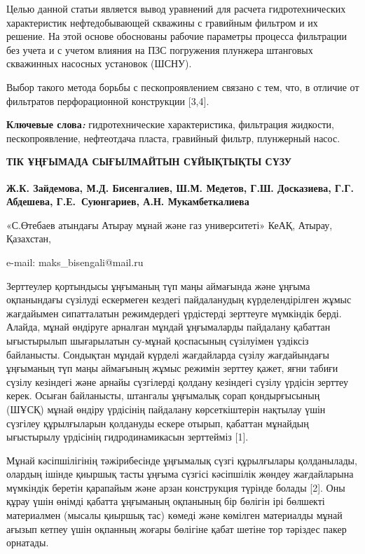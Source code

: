 Целью данной статьи является вывод уравнений для расчета
гидротехнических характеристик нефтедобывающей скважины с гравийным
фильтром и их решение. На этой основе обоснованы рабочие параметры
процесса фильтрации без учета и с учетом влияния на ПЗС погружения
плунжера штанговых скважинных насосных установок (ШСНУ).

Выбор такого метода борьбы с пескопроявлением связано с тем, что, в
отличие от фильтратов перфорационной конструкции {[}3,4{]}.

{\bfseries Ключевые слова\emph{:}} гидротехнические характеристика,
фильтрация жидкости, пескопроявление, нефтеотдача пласта, гравийный
фильтр, плунжерный насос.

\begin{articleheader}
{\bfseries ТІК ҰҢҒЫМАДА СЫҒЫЛМАЙТЫН СҰЙЫҚТЫҚТЫ СҮЗУ}

{\bfseries
Ж.К. Зайдемова,
М.Д. Бисенгалиев\textsuperscript{\envelope },
Ш.М. Медетов,
Г.Ш. Досказиева,
Г.Г. Абдешева,
Г.Е.~Суюнгариев,
А.Н. Мукамбеткалиева
}
\end{articleheader}

\begin{affiliation}
«С.Өтебаев атындағы Атырау мұнай және газ университеті» КеАҚ, Атырау, Қазахстан,

e-mail: maks\_bisengali@mail.ru
\end{affiliation}

Зерттеулер қортындысы ұңғыманың түп маңы аймағында және ұңғыма
оқпанындағы сүзілуді ескермеген кездегі пайдаланудың күрделендірілген
жұмыс жағдайымен сипатталатын режимдердегі үрдістерді зерттеуге
мүмкіндік берді. Алайда, мұнай өндіруге арналған мұндай ұңғымаларды
пайдалану қабаттан ығыстырылып шығарылатын су-мұнай қоспасының
сүзілуімен үздіксіз байланысты. Сондықтан мұндай күрделі жағдайларда
сүзілу жағдайындағы ұңғыманың түп маңы аймағының жұмыс режимін зерттеу
қажет, яғни табиғи сүзілу кезіндегі және арнайы сүзгілерді қолдану
кезіндегі сүзілу үрдісін зерттеу керек. Осыған байланысты, штангалы
ұңғымалық сорап қондырғысының (ШҰСҚ) мұнай өндіру үрдісінің пайдалану
көрсеткіштерін нақтылау үшін сүзгілеу құрылғыларын қолдануды ескере
отырып, қабаттан мұнайдың ығыстырылу үрдісінің гидродинамикасын
зерттейміз {[}1{]}.

Мұнай кәсіпшілігінің тәжірибесінде ұңғымалық сүзгі құрылғылары
қолданылады, олардың ішінде қиыршық тасты ұңғыма сүзгісі кәсіпшілік
жөндеу жағдайларына мүмкіндік беретін қарапайым және арзан конструкция
түрінде болады {[}2{]}. Оны құрау үшін өнімді қабатта ұңғыманың
оқпанының бір бөлігін ірі бөлшекті материалмен (мысалы қиыршық тас)
көмеді және көмілген материалды мұнай ағызып кетпеу үшін оқпанның жоғары
бөлігіне қабат шетіне тор тәріздес пакер орнатады.

